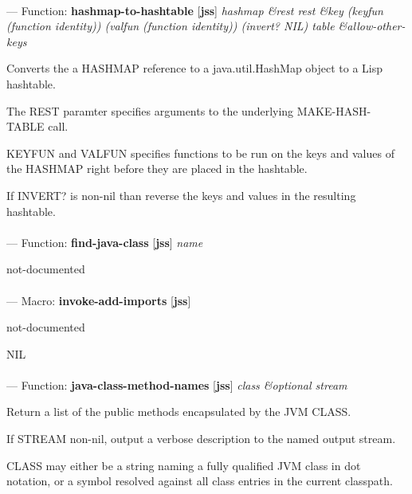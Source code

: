 \paragraph{}
\label{JSS:HASHMAP-TO-HASHTABLE}
--- Function: \textbf{hashmap-to-hashtable} [\textbf{jss}] \textit{hashmap \&rest rest \&key (keyfun (function identity)) (valfun (function identity)) (invert? NIL) table \&allow-other-keys}

\begin{adjustwidth}{5em}{5em}
Converts the a HASHMAP reference to a java.util.HashMap object to a Lisp hashtable.

The REST paramter specifies arguments to the underlying MAKE-HASH-TABLE call.

KEYFUN and VALFUN specifies functions to be run on the keys and values
of the HASHMAP right before they are placed in the hashtable.

If INVERT? is non-nil than reverse the keys and values in the resulting hashtable.
\end{adjustwidth}

\paragraph{}
\label{JSS:FIND-JAVA-CLASS}
--- Function: \textbf{find-java-class} [\textbf{jss}] \textit{name}

\begin{adjustwidth}{5em}{5em}
not-documented
\end{adjustwidth}

\paragraph{}
\label{JSS:INVOKE-ADD-IMPORTS}
--- Macro: \textbf{invoke-add-imports} [\textbf{jss}] \textit{}

\begin{adjustwidth}{5em}{5em}
not-documented
\end{adjustwidth}

NIL

\paragraph{}
\label{JSS:JAVA-CLASS-METHOD-NAMES}
--- Function: \textbf{java-class-method-names} [\textbf{jss}] \textit{class \&optional stream}

\begin{adjustwidth}{5em}{5em}
Return a list of the public methods encapsulated by the JVM CLASS.

If STREAM non-nil, output a verbose description to the named output stream.

CLASS may either be a string naming a fully qualified JVM class in dot
notation, or a symbol resolved against all class entries in the
current classpath.
\end{adjustwidth}

